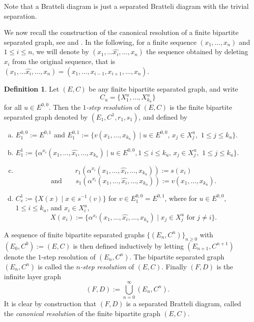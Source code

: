 \documentclass[11pt]{amsart}
\theoremstyle{plain}            %
\theoremstyle{definition}       %
\newtheorem{definition}[theorem]{Definition}
\theoremstyle{definition}       %
\theoremstyle{remark}
\begin{document}
Note that a Bratteli diagram is just a separated Bratteli diagram with the trivial separation.

We now recall the construction of the canonical resolution of a finite bipartite separated graph, see \cite{ae14} and \cite{al18}.
In the following, for a finite sequence $(x_1,\dots , x_n)$ and $1\le i\le n$, we will denote by $(x_1,\dots \widehat{x_i},\dots , x_n)$ the sequence
obtained by deleting $x_i$ from the original sequence, that is $(x_1,\dots \widehat{x_i},\dots , x_n) = (x_1,\dots, x_{i-1},x_{i+1},\dots , x_n)$. 

\begin{definition}\label{def:F.infty.and.others}
	Let $(E,C)$ be any finite bipartite separated graph, and write
	$$C_u = \{X_1^u,\dots,X_{k_u}^u\}$$
	for all $u \in E^{0,0}$. Then the \textit{$1$-step resolution} of $(E,C)$ is the finite bipartite separated graph denoted by $(E_1,C^1, r_1,s_1)$, and defined by
	\begin{enumerate}[(a)]
		\item $E_1^{0,0} := E^{0,1}$ and $E_1^{0,1} := \{v(x_1,\dots,x_{k_u}) \mid u \in E^{0,0},\,  x_j \in X_j^u ,\,\, 1 \leq j \leq k_u\}$.
		\item $E_1^1 := \{\alpha^{x_i}(x_1,\dots,\widehat{x_i},\dots,x_{k_u}) \mid u \in E^{0,0}, 1 \leq i \leq k_u,\,  x_j \in X_j^u ,\,\, 1 \leq j \leq k_u \}$.
		\item $$r_1(\alpha^{x_i}(x_1,\dots,\widehat{x_i},\dots,x_{k_u})) := s(x_i)$$ 
        $$ \text{and} \qquad s_1(\alpha^{x_i}(x_1,\dots,\widehat{x_i},\dots,x_{k_u})) := v(x_1,\dots,x_{k_u}).$$
		\item $C^1_v := \{X(x) \mid x \in s^{-1}(v)\}$ for $v \in E^{0,0}_1=E^{0,1}$, where for $u \in E^{0,0}$, $1 \leq i \leq k_u$, and $x_i\in X_i^u$,
		$$X(x_i) := \{\alpha^{x_i}(x_1,\dots,\widehat{x_i},\dots,x_{k_u}) \mid x_j \in X_j^u \text{ for } j \ne i\}.$$
	\end{enumerate}
	A sequence of finite bipartite separated graphs $\{(E_n,C^n)\}_{n \ge 0}$ with $(E_0,C^0) := (E,C)$ is then defined inductively by letting $(E_{n+1},C^{n+1})$ denote the $1$-step resolution of $(E_n,C^n)$. The bipartite separated graph $(E_n,C^n)$ is called the \textit{$n$-step resolution} of $(E,C)$. Finally $(F,D)$ is the infinite layer graph
	$$(F,D) := \bigcup_{n=0}^{\infty} (E_n,C^n).$$
	It is clear by construction that $(F,D)$ is a separated Bratteli diagram, called the {\it canonical resolution} of the finite bipartite graph $(E,C)$.
\end{definition}
\end{document}
